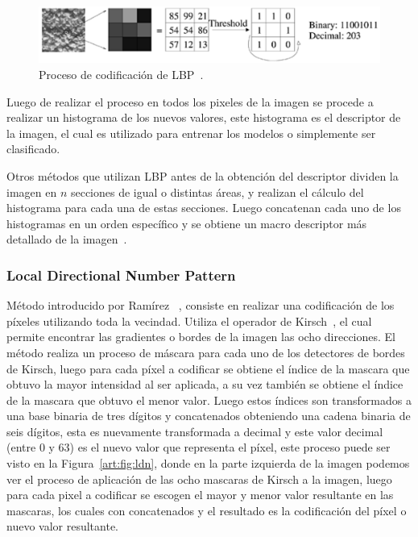\begin{figure}[tb]
  \centering
   \includegraphics[width=1\textwidth]{Figuras/lbp.pdf}
  \caption{Proceso de codificación de LBP~\cite{Ahonen2006}.}
  \label{art:fig:lbp}
\end{figure}

Luego de realizar el proceso en todos los pixeles de la imagen se procede a realizar un histograma de los nuevos valores, este histograma es el descriptor de la imagen, el cual es utilizado para entrenar los modelos o simplemente ser clasificado.

Otros métodos que utilizan LBP antes de la obtención del descriptor dividen la imagen en $n$ secciones de igual o distintas áreas, y realizan el cálculo del histograma para cada una de estas secciones. Luego concatenan cada uno de los histogramas en un orden específico y se obtiene un macro descriptor más detallado de la imagen~\cite{Ahonen2006}.

		\subsubsection{Local Directional Number Pattern}
		\label{sec:ldn}
		Método introducido por Ramírez \etal~\cite{RamirezRivera2013}, consiste en realizar una codificación de los píxeles utilizando toda la vecindad. Utiliza el operador de Kirsch~\cite{Kirsch1971}, el cual permite encontrar las gradientes o bordes de la imagen las ocho direcciones. El método realiza un proceso de máscara para cada uno de los detectores de bordes de Kirsch, luego para cada píxel a codificar se obtiene el índice de la mascara que obtuvo la mayor intensidad al ser aplicada, a su vez también se obtiene el índice de la mascara que obtuvo el menor valor. Luego estos índices son transformados a una base binaria de tres dígitos y concatenados obteniendo una cadena binaria de seis dígitos, esta es nuevamente transformada a decimal y este valor decimal (entre $0$ y $63$) es el nuevo valor que representa el píxel, este proceso puede ser visto en la Figura~\ref{art:fig:ldn}, donde en la parte izquierda de la imagen podemos ver el proceso de aplicación de las ocho mascaras de Kirsch a la imagen, luego para cada pixel a codificar se escogen el mayor y menor valor resultante en las mascaras, los cuales con concatenados y el resultado es la codificación del píxel o nuevo valor resultante.
		
